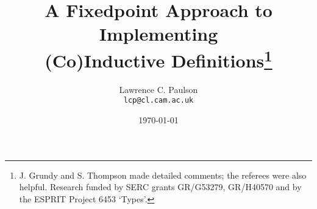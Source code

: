 \newif\ifCADE
\CADEfalse

\title{A Fixedpoint Approach to Implementing\\ 
  (Co)Inductive Definitions\thanks{J. Grundy and S. Thompson made detailed
    comments; the referees were also helpful.  Research funded by
    SERC grants GR/G53279, GR/H40570 and by the ESPRIT Project 6453
    `Types'.}}

\author{Lawrence C. Paulson\\{\tt lcp@cl.cam.ac.uk}}
\date{\today} 
\setcounter{secnumdepth}{2} \setcounter{tocdepth}{2}

\newcommand\sbs{\subseteq}
\let\To=\Rightarrow


\newcommand\pow{{\cal P}}
\newcommand\RepFun{\hbox{\tt RepFun}}
\newcommand\cons{\hbox{\tt cons}}
\def\succ{\hbox{\tt succ}}
\newcommand\split{\hbox{\tt split}}
\newcommand\fst{\hbox{\tt fst}}
\newcommand\snd{\hbox{\tt snd}}
\newcommand\converse{\hbox{\tt converse}}
\newcommand\domain{\hbox{\tt domain}}
\newcommand\range{\hbox{\tt range}}
\newcommand\field{\hbox{\tt field}}
\newcommand\lfp{\hbox{\tt lfp}}
\newcommand\gfp{\hbox{\tt gfp}}
\newcommand\id{\hbox{\tt id}}
\newcommand\trans{\hbox{\tt trans}}
\newcommand\wf{\hbox{\tt wf}}
\newcommand\nat{\hbox{\tt nat}}
\newcommand\rank{\hbox{\tt rank}}
\newcommand\univ{\hbox{\tt univ}}
\newcommand\Vrec{\hbox{\tt Vrec}}
\newcommand\Inl{\hbox{\tt Inl}}
\newcommand\Inr{\hbox{\tt Inr}}
\newcommand\case{\hbox{\tt case}}
\newcommand\lst{\hbox{\tt list}}
\newcommand\Nil{\hbox{\tt Nil}}
\newcommand\Cons{\hbox{\tt Cons}}
\newcommand\lstcase{\hbox{\tt list\_case}}
\newcommand\lstrec{\hbox{\tt list\_rec}}
\newcommand\length{\hbox{\tt length}}
\newcommand\listn{\hbox{\tt listn}}
\newcommand\acc{\hbox{\tt acc}}
\newcommand\primrec{\hbox{\tt primrec}}
\newcommand\SC{\hbox{\tt SC}}
\newcommand\CONST{\hbox{\tt CONST}}
\newcommand\PROJ{\hbox{\tt PROJ}}
\newcommand\COMP{\hbox{\tt COMP}}
\newcommand\PREC{\hbox{\tt PREC}}

\newcommand\quniv{\hbox{\tt quniv}}
\newcommand\llist{\hbox{\tt llist}}
\newcommand\LNil{\hbox{\tt LNil}}
\newcommand\LCons{\hbox{\tt LCons}}
\newcommand\lconst{\hbox{\tt lconst}}
\newcommand\lleq{\hbox{\tt lleq}}
\newcommand\map{\hbox{\tt map}}
\newcommand\term{\hbox{\tt term}}
\newcommand\Apply{\hbox{\tt Apply}}
\newcommand\termcase{\hbox{\tt term\_case}}
\newcommand\rev{\hbox{\tt rev}}
\newcommand\reflect{\hbox{\tt reflect}}
\newcommand\tree{\hbox{\tt tree}}
\newcommand\forest{\hbox{\tt forest}}
\newcommand\Part{\hbox{\tt Part}}
\newcommand\TF{\hbox{\tt tree\_forest}}
\newcommand\Tcons{\hbox{\tt Tcons}}
\newcommand\Fcons{\hbox{\tt Fcons}}
\newcommand\Fnil{\hbox{\tt Fnil}}
\newcommand\TFcase{\hbox{\tt TF\_case}}
\newcommand\Fin{\hbox{\tt Fin}}
\newcommand\QInl{\hbox{\tt QInl}}
\newcommand\QInr{\hbox{\tt QInr}}
\newcommand\qsplit{\hbox{\tt qsplit}}
\newcommand\qcase{\hbox{\tt qcase}}
\newcommand\Con{\hbox{\tt Con}}
\newcommand\data{\hbox{\tt data}}

